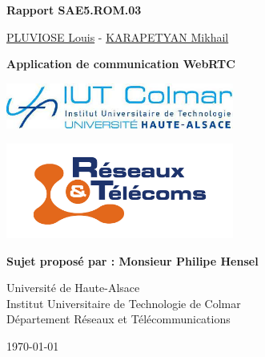 \documentclass[12pt, a4paper, oneside]{thesis}
\begin{document}
\author{\href{https://portfolio.louispluviose.fr}{PLUVIOSE Louis} - \href{https://karap.fr}{KARAPETYAN Mikhail}}

\begin{center}
{\LARGE \textbf{Rapport SAE5.ROM.03}}

\vspace{1cm}

{\Large {\href{https://portfolio.louispluviose.fr}{PLUVIOSE Louis} - \href{https://karap.fr}{KARAPETYAN Mikhail}}}

\vspace{1cm}

{\LARGE \textbf{Application de communication WebRTC}}

\vspace{2cm}

\includegraphics[width=7.5cm]{images/logo-iut-colmar.jpg}

\vspace{0.5cm}

\includegraphics[width=7.5cm]{images/logo-but-rt.png}

\vspace{2cm}

\textbf{Sujet proposé par : Monsieur Philipe Hensel} \\

\vspace{1cm}

Université de Haute-Alsace \\
Institut Universitaire de Technologie de Colmar \\
Département Réseaux et Télécommunications \\

\vspace{3cm}

{\large \mydate\today}

\end{center}

\newpage

\tableofcontents
\end{document}
